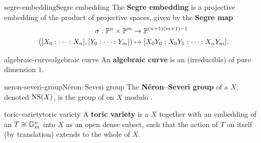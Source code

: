 \begin{topic}{segre-embedding}{Segre embedding}
    The \textbf{Segre embedding} is a projective embedding of the product of projective spaces, given by the \textbf{Segre map}
    \[ \begin{aligned}
        \sigma : \mathbb{P}^n \times \mathbb{P}^m &\to \mathbb{P}^{(n + 1)(m + 1) - 1} \\
        ([X_0 : \cdots : X_n], [Y_0 : \cdots : Y_m]) &\mapsto [X_0 Y_0 : X_0 Y_1 : \cdots : X_n Y_m] .
    \end{aligned} \]
\end{topic}

\begin{topic}{algebraic-curve}{algebraic curve}
    An \textbf{algebraic curve} is an (irreducible)  of pure dimension $1$.
\end{topic}

\begin{topic}{neron-severi-group}{Néron--Severi group}
    The \textbf{Néron--Severi group} of a  $X$, denoted $\textup{NS}(X)$, is the group of  on $X$ modulo .
\end{topic}

\begin{topic}{toric-variety}{toric variety}
    A \textbf{toric variety} is a  $X$ together with an embedding of an  $T \cong \mathbb{G}_m^n$ into $X$ as an open dense subset, such that the action of $T$ on itself (by translation) extends to the whole of $X$.
\end{topic}

